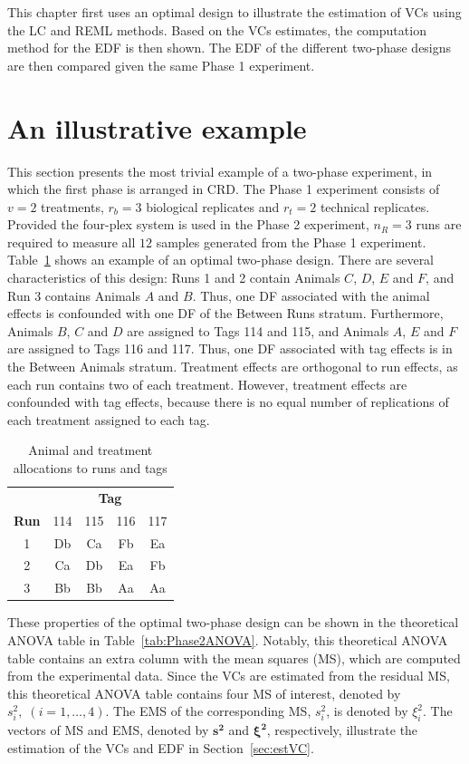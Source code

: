 \documentclass[12pt,a4paper]{article}
\begin{document}
This chapter first uses an optimal design to illustrate the estimation of VCs using the LC and REML methods. Based on the VCs estimates, the computation method for the EDF is then shown. The EDF of the different two-phase designs are then compared given the same Phase 1 experiment. 

\section{An illustrative example}
\label{sec:expDes}
This section presents the most trivial example of a two-phase experiment, in which the first phase is arranged in CRD. The Phase 1 experiment consists of $v = 2$ treatments, $r_b = 3$ biological replicates and $r_t = 2$ technical replicates. Provided the four-plex system is used in the Phase 2 experiment, $n_R = 3$ runs are required to measure all $12$ samples generated from the Phase 1 experiment. Table~\ref{tab:aniDes1} shows an example of an optimal two-phase design. There are several characteristics of this design: Runs 1 and 2 contain Animals $C$, $D$, $E$ and $F$, and Run 3 contains Animals $A$ and $B$. Thus, one DF associated with the animal effects is confounded with one DF of the Between Runs stratum. Furthermore, Animals $B$, $C$ and $D$ are assigned to Tags 114 and 115, and Animals $A$, $E$ and $F$ are assigned to Tags 116 and 117. Thus, one DF associated with tag effects is in the Between Animals stratum. Treatment effects are orthogonal to run effects, as each run contains two of each treatment. However, treatment effects are confounded with tag effects, because there is no equal number of replications of each treatment assigned to each tag. 

\begin{table}[ht]
\centering
\itshape
\caption{Animal and treatment allocations to runs and tags}
\begin{tabular}{c|cccc}
 & \multicolumn{4}{c}{{\bf Tag}} \\
{\bf Run}  & \textnormal{114} & \textnormal{115} & \textnormal{116} & \textnormal{117} \\ 
\hline 
\textnormal{1} & Db & Ca & Fb & Ea \\  
\textnormal{2} & Ca & Db & Ea & Fb \\  
\textnormal{3} & Bb & Bb & Aa & Aa \\ 
\end{tabular} 
\label{tab:aniDes1}
\end{table}

These properties of the optimal two-phase design can be shown in the theoretical ANOVA table in Table~\ref{tab:Phase2ANOVA}. Notably, this theoretical ANOVA table contains an extra column with the mean squares (MS), which are computed from the experimental data. Since the VCs are estimated from the residual MS, this theoretical ANOVA table contains four MS of interest, denoted by $s_i^2, \; (i = 1,\dots, 4).$ The EMS of the corresponding MS, $s_i^2$, is denoted by $\xi_i^2$. The vectors of MS and EMS, denoted by $\bm{s^2}$ and $\bm{\xi^2}$, respectively, illustrate the estimation of the VCs and EDF in Section~\ref{sec:estVC}.
\end{document}

